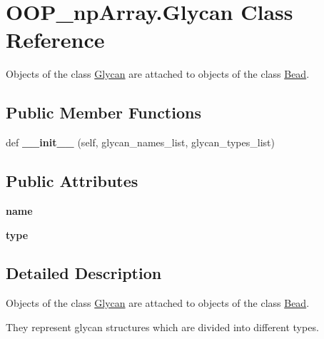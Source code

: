 \hypertarget{class_o_o_p__np_array_1_1_glycan}{}\section{O\+O\+P\+\_\+np\+Array.\+Glycan Class Reference}
\label{class_o_o_p__np_array_1_1_glycan}


Objects of the class \mbox{\hyperlink{class_o_o_p__np_array_1_1_glycan}{Glycan}} are attached to objects of the class \mbox{\hyperlink{class_o_o_p__np_array_1_1_bead}{Bead}}.  


\subsection*{Public Member Functions}
\begin{DoxyCompactItemize}
\item 
\mbox{\label{class_o_o_p__np_array_1_1_glycan_a6ef0d3f7150be4d292bd1f0839b1db04}} 
def {\bfseries \+\_\+\+\_\+init\+\_\+\+\_\+} (self, glycan\+\_\+names\+\_\+list, glycan\+\_\+types\+\_\+list)
\end{DoxyCompactItemize}
\subsection*{Public Attributes}
\begin{DoxyCompactItemize}
\item 
\mbox{\label{class_o_o_p__np_array_1_1_glycan_a05a9a4f3e2f75c16c74c2af9a5f965c3}} 
{\bfseries name}
\item 
\mbox{\label{class_o_o_p__np_array_1_1_glycan_a3cd19a1f38e8ee9d84235ef9b0a86310}} 
{\bfseries type}
\end{DoxyCompactItemize}


\subsection{Detailed Description}
Objects of the class \mbox{\hyperlink{class_o_o_p__np_array_1_1_glycan}{Glycan}} are attached to objects of the class \mbox{\hyperlink{class_o_o_p__np_array_1_1_bead}{Bead}}. 

They represent glycan structures which are divided into different types.


